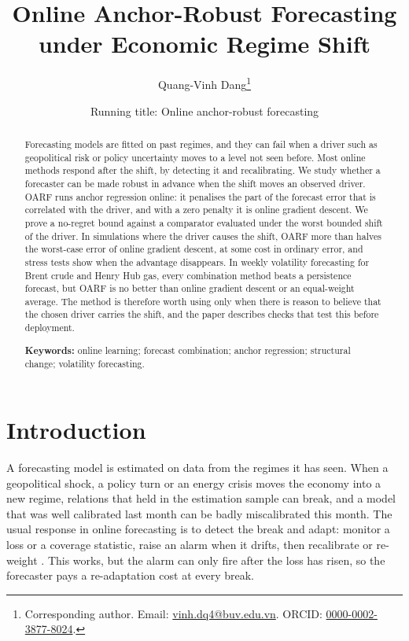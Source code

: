 \documentclass[12pt]{article}
\title{\bfseries Online Anchor-Robust Forecasting under Economic Regime Shift}
\author[1]{Quang-Vinh Dang\thanks{Corresponding author. Email:
\href{mailto:vinh.dq4@buv.edu.vn}{vinh.dq4@buv.edu.vn}. ORCID:
\href{https://orcid.org/0000-0002-3877-8024}{0000-0002-3877-8024}.}}
\affil[1]{\small British University Vietnam, Hung Yen, Vietnam}
\date{\small Running title: Online anchor-robust forecasting}
\theoremstyle{plain}
\theoremstyle{remark}
\begin{document}
\maketitle

\begin{abstract}
\noindent
Forecasting models are fitted on past regimes, and they can fail when a driver such
as geopolitical risk or policy uncertainty moves to a level not seen before. Most
online methods respond after the shift, by detecting it and recalibrating. We study
whether a forecaster can be made robust in advance when the shift moves an observed
driver. OARF runs anchor regression online: it penalises the part of the forecast
error that is correlated with the driver, and with a zero penalty it is online
gradient descent. We prove a no-regret bound against a comparator evaluated under
the worst bounded shift of the driver. In simulations where the driver causes the
shift, OARF more than halves the worst-case error of online gradient descent, at
some cost in ordinary error, and stress tests show when the advantage disappears.
In weekly volatility forecasting for Brent crude and Henry Hub gas, every
combination method beats a persistence forecast, but OARF is no better than online
gradient descent or an equal-weight average. The method is therefore worth using
only when there is reason to believe that the chosen driver carries the shift, and
the paper describes checks that test this before deployment.

\vspace{0.6em}
\noindent\textbf{Keywords:} online learning; forecast combination; anchor
regression; structural change; volatility forecasting.
\end{abstract}

\section{Introduction}\label{sec:intro}

A forecasting model is estimated on data from the regimes it has seen. When a
geopolitical shock, a policy turn or an energy crisis moves the economy into a new
regime, relations that held in the estimation sample can break, and a model that was
well calibrated last month can be badly miscalibrated this month. The usual response
in online forecasting is to detect the break and adapt: monitor a loss or a coverage
statistic, raise an alarm when it drifts, then recalibrate or re-weight
\citep{gibbs2021aci,mfisher2025,watch2025}. This works, but the alarm can only fire
after the loss has risen, so the forecaster pays a re-adaptation cost at every break.
\end{document}
